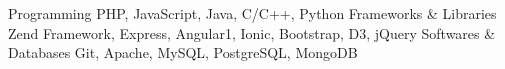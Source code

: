 \begin{cvskills}
  \cvskill
    {Programming}
    {PHP, JavaScript, Java, C/C++, Python}
  \cvskill
  {Frameworks \& Libraries}
  {Zend Framework, Express, Angular1, Ionic, Bootstrap, D3, jQuery}  
  \cvskill
  {Softwares \& Databases}
  {Git, Apache, MySQL, PostgreSQL, MongoDB}      
    
\end{cvskills}
